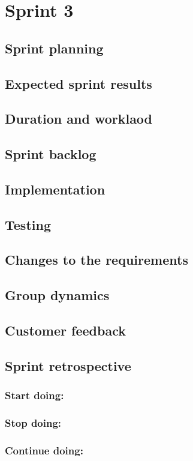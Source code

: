 \section{Sprint 3}

\subsection{Sprint planning}

\subsection{Expected sprint results}

\subsection{Duration and worklaod}

\subsection{Sprint backlog}

\subsection{Implementation}

\subsection{Testing}

\subsection{Changes to the requirements}

\subsection{Group dynamics}

\subsection{Customer feedback}

\subsection{Sprint retrospective}
	\subsubsection*{Start doing: } 
	\subsubsection*{Stop doing: }
	\subsubsection*{Continue doing: }